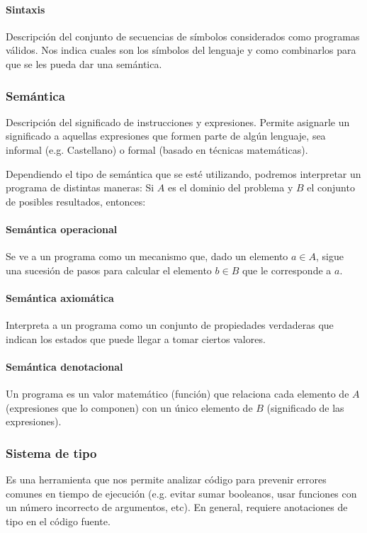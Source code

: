 \paragraph{Sintaxis} Descripción del conjunto de secuencias de símbolos considerados como programas válidos. Nos indica cuales son los símbolos del lenguaje y como combinarlos para que se les pueda dar una semántica.

\subsubsection{Semántica}

Descripción del significado de instrucciones y expresiones. Permite asignarle un significado a aquellas expresiones que formen parte de algún lenguaje, sea informal (e.g. Castellano) o formal (basado en técnicas matemáticas).

Dependiendo el tipo de semántica que se esté utilizando, podremos interpretar un programa de distintas maneras:  Si \(A\) es el dominio del problema y \(B\) el conjunto de posibles resultados, entonces:

\paragraph{Semántica operacional} Se ve a un programa como un mecanismo que, dado un elemento \(a\in A \), sigue una sucesión de pasos para calcular el elemento \(b \in B\) que le corresponde  a \(a\).

\paragraph{Semántica axiomática} Interpreta a un programa como un conjunto de propiedades verdaderas que indican los estados que puede llegar a tomar ciertos valores.

\paragraph{Semántica denotacional} Un programa es un valor matemático (función) que relaciona cada elemento de \(A\) (expresiones que lo componen) con un único elemento de \(B\) (significado de las expresiones).

\subsubsection{Sistema de tipo}
Es una herramienta que nos permite analizar código para prevenir errores comunes en tiempo de ejecución (e.g. evitar sumar booleanos, usar funciones con un número incorrecto de argumentos, etc). En general, requiere anotaciones de tipo en el código fuente. 

